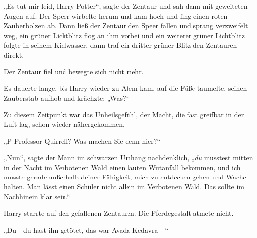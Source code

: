 „Es tut mir leid, Harry Potter“, sagte der Zentaur und sah dann mit geweiteten Augen auf. Der Speer wirbelte herum und kam hoch und fing einen roten Zauberbolzen ab. Dann ließ der Zentaur den Speer fallen und sprang verzweifelt weg, ein grüner Lichtblitz flog an ihm vorbei und ein weiterer grüner Lichtblitz folgte in seinem Kielwasser, dann traf ein dritter grüner Blitz den Zentauren direkt.

Der Zentaur fiel und bewegte sich nicht mehr.

Es dauerte lange, bis Harry wieder zu Atem kam, auf die Füße taumelte, seinen Zauberstab aufhob und krächzte:
„Was?“

Zu diesem Zeitpunkt war das Unheilsgefühl, der Macht, die fast greifbar in der Luft lag, schon wieder nähergekommen.

„P-Professor Quirrell? Was machen Sie denn hier?“

„Nun“, sagte der Mann im schwarzen Umhang nachdenklich, „\emph{du} musstest mitten in der Nacht im Verbotenen Wald einen lauten Wutanfall bekommen, und ich musste gerade außerhalb deiner Fähigkeit, mich zu entdecken gehen und Wache halten. Man lässt einen Schüler nicht allein im Verbotenen Wald. Das sollte im Nachhinein klar sein.“

Harry starrte auf den gefallenen Zentauren. Die Pferdegestalt atmete nicht.

„Du—du hast ihn getötet, das war Avada Kedavra—“

